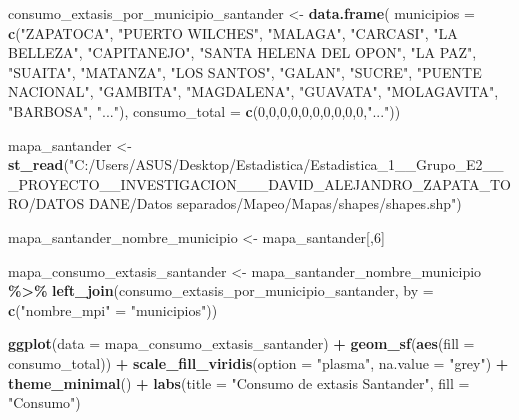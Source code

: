 \documentclass[
]{article}
\newenvironment{Shaded}{\begin{snugshade}}{\end{snugshade}}
\newcommand{\AttributeTok}[1]{\textcolor[rgb]{0.13,0.29,0.53}{#1}}
\newcommand{\DecValTok}[1]{\textcolor[rgb]{0.00,0.00,0.81}{#1}}
\newcommand{\FunctionTok}[1]{\textcolor[rgb]{0.13,0.29,0.53}{\textbf{#1}}}
\newcommand{\NormalTok}[1]{#1}
\newcommand{\OtherTok}[1]{\textcolor[rgb]{0.56,0.35,0.01}{#1}}
\newcommand{\SpecialCharTok}[1]{\textcolor[rgb]{0.81,0.36,0.00}{\textbf{#1}}}
\newcommand{\StringTok}[1]{\textcolor[rgb]{0.31,0.60,0.02}{#1}}
\begin{document}
\begin{Shaded}
\begin{Highlighting}[]
\NormalTok{consumo\_extasis\_por\_municipio\_santander }\OtherTok{\textless{}{-}} \FunctionTok{data.frame}\NormalTok{(}
  \AttributeTok{municipios =} \FunctionTok{c}\NormalTok{(}\StringTok{"ZAPATOCA"}\NormalTok{, }\StringTok{"PUERTO WILCHES"}\NormalTok{, }\StringTok{"MALAGA"}\NormalTok{, }\StringTok{"CARCASI"}\NormalTok{, }\StringTok{"LA BELLEZA"}\NormalTok{, }\StringTok{"CAPITANEJO"}\NormalTok{, }\StringTok{"SANTA HELENA DEL OPON"}\NormalTok{, }\StringTok{"LA PAZ"}\NormalTok{, }\StringTok{"SUAITA"}\NormalTok{, }\StringTok{"MATANZA"}\NormalTok{, }
                 \StringTok{"LOS SANTOS"}\NormalTok{, }\StringTok{"GALAN"}\NormalTok{, }\StringTok{"SUCRE"}\NormalTok{, }\StringTok{"PUENTE NACIONAL"}\NormalTok{, }\StringTok{"GAMBITA"}\NormalTok{, }\StringTok{"MAGDALENA"}\NormalTok{, }\StringTok{"GUAVATA"}\NormalTok{, }\StringTok{"MOLAGAVITA"}\NormalTok{, }\StringTok{"BARBOSA"}\NormalTok{, }\StringTok{"..."}\NormalTok{),}
  \AttributeTok{consumo\_total =} \FunctionTok{c}\NormalTok{(}\DecValTok{0}\NormalTok{,}\DecValTok{0}\NormalTok{,}\DecValTok{0}\NormalTok{,}\DecValTok{0}\NormalTok{,}\DecValTok{0}\NormalTok{,}\DecValTok{0}\NormalTok{,}\DecValTok{0}\NormalTok{,}\DecValTok{0}\NormalTok{,}\DecValTok{0}\NormalTok{,}\DecValTok{0}\NormalTok{,}\StringTok{"..."}\NormalTok{))}

\NormalTok{mapa\_santander }\OtherTok{\textless{}{-}} \FunctionTok{st\_read}\NormalTok{(}\StringTok{"C:/Users/ASUS/Desktop/Estadistica/Estadistica\_1\_\_Grupo\_E2\_\_\_PROYECTO\_\_INVESTIGACION\_\_\_DAVID\_ALEJANDRO\_ZAPATA\_TORO/DATOS DANE/Datos separados/Mapeo/Mapas/shapes/shapes.shp"}\NormalTok{)}

\NormalTok{mapa\_santander\_nombre\_municipio }\OtherTok{\textless{}{-}}\NormalTok{ mapa\_santander[,}\DecValTok{6}\NormalTok{]}

\NormalTok{mapa\_consumo\_extasis\_santander }\OtherTok{\textless{}{-}}\NormalTok{ mapa\_santander\_nombre\_municipio }\SpecialCharTok{\%\textgreater{}\%}
  \FunctionTok{left\_join}\NormalTok{(consumo\_extasis\_por\_municipio\_santander, }\AttributeTok{by =} \FunctionTok{c}\NormalTok{(}\StringTok{"nombre\_mpi"} \OtherTok{=} \StringTok{"municipios"}\NormalTok{)) }

\FunctionTok{ggplot}\NormalTok{(}\AttributeTok{data =}\NormalTok{ mapa\_consumo\_extasis\_santander) }\SpecialCharTok{+}
  \FunctionTok{geom\_sf}\NormalTok{(}\FunctionTok{aes}\NormalTok{(}\AttributeTok{fill =}\NormalTok{ consumo\_total)) }\SpecialCharTok{+}
  \FunctionTok{scale\_fill\_viridis}\NormalTok{(}\AttributeTok{option =} \StringTok{"plasma"}\NormalTok{, }\AttributeTok{na.value =} \StringTok{"grey"}\NormalTok{) }\SpecialCharTok{+}
  \FunctionTok{theme\_minimal}\NormalTok{() }\SpecialCharTok{+}
  \FunctionTok{labs}\NormalTok{(}\AttributeTok{title =} \StringTok{"Consumo de extasis Santander"}\NormalTok{,}
       \AttributeTok{fill =} \StringTok{"Consumo"}\NormalTok{)}
\end{Highlighting}
\end{Shaded}
\end{document}
